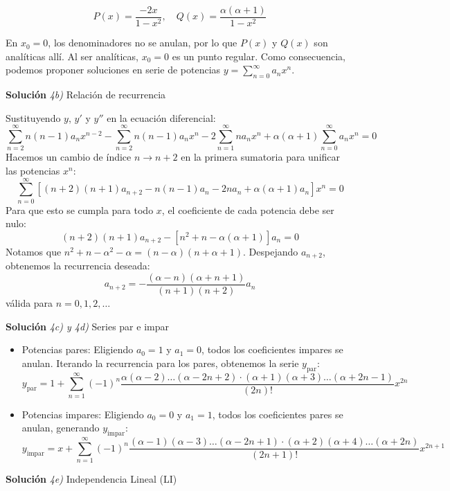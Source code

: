 \documentclass[11pt,spanish]{article}
\begin{document}
$$P(x) = \frac{-2x}{1-x^2}, \quad Q(x) = \frac{\alpha(\alpha+1)}{1-x^2}$$

En $x_0=0$, los denominadores no se anulan, por lo que $P(x)$ y $Q(x)$ son analíticas allí. Al ser analíticas, $x_0=0$ es un punto regular. Como consecuencia, podemos proponer soluciones en serie de potencias $y = \sum_{n=0}^{\infty} a_n x^n$.

\vspace{0.5cm}
{\bf Soluci\'on }{\em 4b)}
Relación de recurrencia
\vspace{0.5cm}

Sustituyendo $y$, $y'$ y $y''$ en la ecuación diferencial:
$$\sum_{n=2}^{\infty}n(n-1)a_{n}x^{n-2} - \sum_{n=2}^{\infty}n(n-1)a_{n}x^{n} - 2\sum_{n=1}^{\infty}na_{n}x^{n} + \alpha(\alpha+1)\sum_{n=0}^{\infty}a_{n}x^{n} = 0$$
Hacemos un cambio de índice $n \to n+2$ en la primera sumatoria para unificar las potencias $x^n$:
$$\sum_{n=0}^{\infty} \left[ (n+2)(n+1)a_{n+2} - n(n-1)a_n - 2na_n + \alpha(\alpha+1)a_n \right] x^n = 0$$
Para que esto se cumpla para todo $x$, el coeficiente de cada potencia debe ser nulo:
$$(n+2)(n+1)a_{n+2} - \left[ n^2 + n - \alpha(\alpha+1) \right] a_n = 0$$
Notamos que $n^2 + n - \alpha^2 - \alpha = (n-\alpha)(n+\alpha+1)$. Despejando $a_{n+2}$, obtenemos la recurrencia deseada:
$$a_{n+2} = -\frac{(\alpha-n)(\alpha+n+1)}{(n+1)(n+2)}a_n$$
válida para $n=0, 1, 2, \dots$

\vspace{0.5cm}
{\bf Soluci\'on }{\em 4c) y 4d)}
Series par e impar
\vspace{0.5cm}

\begin{itemize}
\item Potencias pares: Eligiendo $a_0=1$ y $a_1=0$, todos los coeficientes impares se anulan. Iterando la recurrencia para los pares, obtenemos la serie $y_{\text{par}}$:
$$y_{\text{par}}=1+\sum_{n=1}^{\infty}(-1)^{n}\frac{\alpha(\alpha-2)\dots(\alpha-2n+2)\cdot(\alpha+1)(\alpha+3)\dots(\alpha+2n-1)}{(2n)!}x^{2n}$$

\item Potencias impares: 
Eligiendo $a_0=0$ y $a_1=1$, todos los coeficientes pares se anulan, generando $y_{\text{impar}}$:
$$y_{\text{impar}}=x+\sum_{n=1}^{\infty}(-1)^{n}\frac{(\alpha-1)(\alpha-3)\dots(\alpha-2n+1)\cdot(\alpha+2)(\alpha+4)\dots(\alpha+2n)}{(2n+1)!}x^{2n+1}$$
\end{itemize}

\vspace{0.5cm}
{\bf Soluci\'on }{\em 4e)}
Independencia Lineal (LI)
\vspace{0.5cm}
\end{document}
